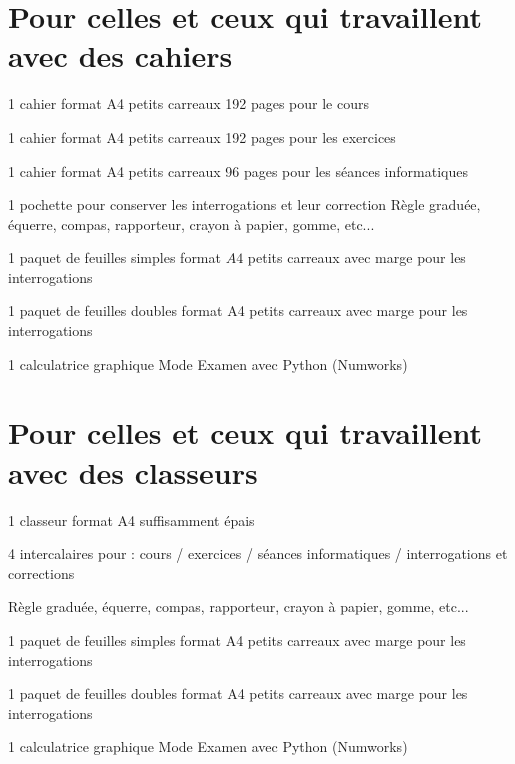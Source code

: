 \documentclass[11pt,a4paper]{article}  %
\begin{document}
	\graphicspath{{images/}}
	
	\begin{center}
		
		
	\end{center}

\section*{Pour celles et ceux qui travaillent avec des cahiers}

\begin{itemMet}
	\item 1 cahier format A4 petits carreaux 192 pages pour le cours 
	\item 1 cahier format A4 petits carreaux 192 pages pour les exercices 
	\item 1 cahier format A4 petits carreaux 96 pages pour les séances informatiques 
	\item 1 pochette pour conserver les interrogations et leur correction Règle graduée, équerre, compas, rapporteur, crayon à papier, gomme, etc... 
	\item 1 paquet de feuilles simples format $A 4$ petits carreaux avec marge pour les interrogations 
	\item 1 paquet de feuilles doubles format A4 petits carreaux avec marge pour les interrogations 
	\item 1 calculatrice graphique Mode Examen avec Python (Numworks)
\end{itemMet}

\section*{Pour celles et ceux qui travaillent avec des classeurs}

\begin{itemMet}
	\item 1 classeur format A4 suffisamment épais
	\item 4 intercalaires pour : cours / exercices / séances informatiques / interrogations et corrections 
	\item Règle graduée, équerre, compas, rapporteur, crayon à papier, gomme, etc...
	\item 1 paquet de feuilles simples format A4 petits carreaux avec marge pour les interrogations
	\item 1 paquet de feuilles doubles format A4 petits carreaux avec marge pour les interrogations 
	\item 1 calculatrice graphique Mode Examen avec Python (Numworks)
\end{itemMet}
\end{document}
